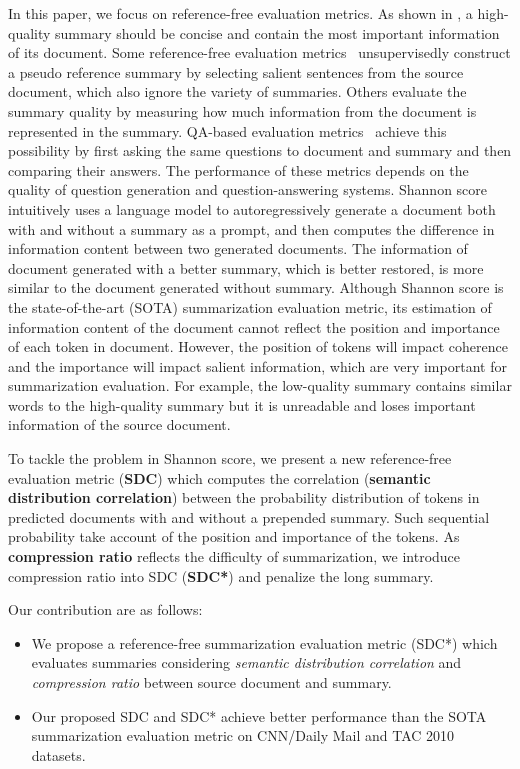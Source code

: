 In this paper, we focus on reference-free evaluation metrics.
As shown in , a high-quality summary should be concise and contain the most important information of its document.
Some reference-free evaluation metrics~\cite{shao2017efficient,gao-etal-2020-supert} unsupervisedly construct a pseudo reference summary by selecting salient sentences from the source document,
which also ignore the variety of summaries.
Others evaluate the summary quality by measuring how much information
from the document is represented in the summary. 
QA-based evaluation metrics~\cite{chen2018semantic,scialom2019answers,durmus2020feqa}  achieve this possibility by first asking the same questions to document and summary and then comparing their answers. 
The performance of these metrics depends on the quality of question generation and question-answering systems.
Shannon score~\cite{shannon22}
intuitively uses a language model to autoregressively generate a document both with and without a summary as a prompt, and then computes the difference in information content between two generated documents.
The information of document generated with a better summary, 
which is better restored,
is more similar to the document generated without summary.
Although Shannon score is the state-of-the-art (SOTA) summarization evaluation metric, 
its estimation of information content of the document 
cannot reflect the position and importance of each token in document.
However, the position of tokens will impact coherence and the importance will impact salient information,
which are very important for summarization evaluation. 
For example, 
the low-quality summary contains similar words to the high-quality summary
but it is unreadable and loses important information of the source document. 

To tackle the problem in Shannon score, we present a new reference-free evaluation metric ({\bf SDC}) which computes the correlation ({\bf semantic distribution correlation}) between the probability distribution of tokens in predicted documents with and without a prepended summary. 
Such sequential probability take account of the position and importance of the tokens.
As {\bf compression ratio} reflects the difficulty of summarization,
we introduce compression ratio into SDC ({\bf SDC*}) and penalize the long summary.

Our contribution are as follows:
\begin{itemize}
\item We propose a reference-free summarization evaluation metric (SDC*) which evaluates summaries considering {\em semantic distribution correlation} and {\em compression ratio} between source document and summary.
\item Our proposed SDC and SDC* achieve better performance than the SOTA summarization evaluation metric on CNN/Daily Mail and TAC 2010 datasets.
\end{itemize}
